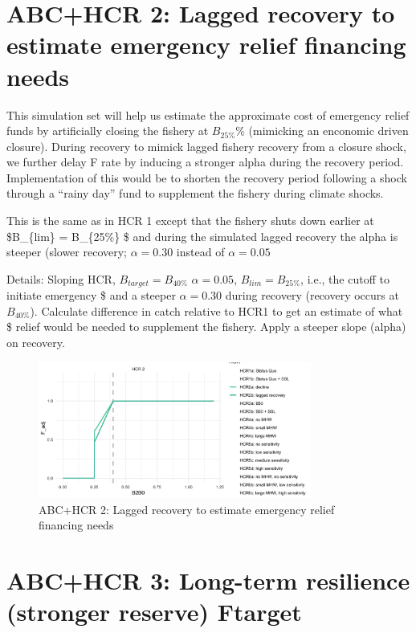 \documentclass[
]{article}
\begin{document}
\section{ABC+HCR 2: Lagged recovery to estimate emergency relief
financing
needs}\label{abchcr-2-lagged-recovery-to-estimate-emergency-relief-financing-needs}

This simulation set will help us estimate the approximate cost of
emergency relief funds by artificially closing the fishery at
\(B_{25\%}\)\% (mimicking an enconomic driven closure). During recovery
to mimick lagged fishery recovery from a closure shock, we further delay
F rate by inducing a stronger alpha during the recovery period.
Implementation of this would be to shorten the recovery period following
a shock through a ``rainy day'' fund to supplement the fishery during
climate shocks.

This is the same as in HCR 1 except that the fishery shuts down earlier
at \$B\_\{lim\} = B\_\{25\%\} \$ and during the simulated lagged
recovery the alpha is steeper (slower recovery; \(\alpha = 0.30\)
instead of \(\alpha = 0.05\)

Details: Sloping HCR, \(B_{target} = B_{40\%}\) \(\alpha = 0.05\),
\(B_{lim} = B_{25\%}\), i.e., the cutoff to initiate emergency \$ and a
steeper \(\alpha = 0.30\) during recovery (recovery occurs at
\(B_{40\%}\)). Calculate difference in catch relative to HCR1 to get an
estimate of what \$ relief would be needed to supplement the fishery.
Apply a steeper slope (alpha) on recovery.

\begin{figure}
\centering
\includegraphics[width=0.8\textwidth,height=\textheight]{../../Figs/HCR_figs/HCR2.png}
\caption{ABC+HCR 2: Lagged recovery to estimate emergency relief
financing needs}
\end{figure}

\section{ABC+HCR 3: Long-term resilience (stronger reserve)
Ftarget}\label{abchcr-3-long-term-resilience-stronger-reserve-ftarget}
\end{document}
